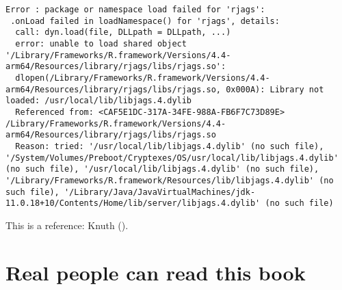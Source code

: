 \documentclass[
  12pt,
  letterpaper,
]{book}
\begin{document}
\begin{verbatim}
Error : package or namespace load failed for 'rjags':
 .onLoad failed in loadNamespace() for 'rjags', details:
  call: dyn.load(file, DLLpath = DLLpath, ...)
  error: unable to load shared object '/Library/Frameworks/R.framework/Versions/4.4-arm64/Resources/library/rjags/libs/rjags.so':
  dlopen(/Library/Frameworks/R.framework/Versions/4.4-arm64/Resources/library/rjags/libs/rjags.so, 0x000A): Library not loaded: /usr/local/lib/libjags.4.dylib
  Referenced from: <CAF5E1DC-317A-34FE-988A-FB6F7C73D89E> /Library/Frameworks/R.framework/Versions/4.4-arm64/Resources/library/rjags/libs/rjags.so
  Reason: tried: '/usr/local/lib/libjags.4.dylib' (no such file), '/System/Volumes/Preboot/Cryptexes/OS/usr/local/lib/libjags.4.dylib' (no such file), '/usr/local/lib/libjags.4.dylib' (no such file), '/Library/Frameworks/R.framework/Resources/lib/libjags.4.dylib' (no such file), '/Library/Java/JavaVirtualMachines/jdk-11.0.18+10/Contents/Home/lib/server/libjags.4.dylib' (no such file)
\end{verbatim}

This is a reference: Knuth ().

\section{Real people can read this
book}\label{real-people-can-read-this-book}
\end{document}
